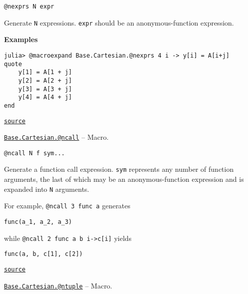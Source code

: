 \begin{adjustwidth}{2em}{0pt}


\begin{verbatim}
@nexprs N expr
\end{verbatim}

Generate \texttt{N} expressions. \texttt{expr} should be an anonymous-function expression.

\textbf{Examples}


\begin{verbatim}
julia> @macroexpand Base.Cartesian.@nexprs 4 i -> y[i] = A[i+j]
quote
    y[1] = A[1 + j]
    y[2] = A[2 + j]
    y[3] = A[3 + j]
    y[4] = A[4 + j]
end
\end{verbatim}



\href{https://github.com/JuliaLang/julia/blob/9058264a69f9efc1af805c4473c946f87859b731/base/cartesian.jl#L111-L126}{\texttt{source}}


\end{adjustwidth}
\hypertarget{16431416314224139891}{}
\hyperlink{16431416314224139891}{\texttt{Base.Cartesian.@ncall}}  -- {Macro.}

\begin{adjustwidth}{2em}{0pt}


\begin{verbatim}
@ncall N f sym...
\end{verbatim}

Generate a function call expression. \texttt{sym} represents any number of function arguments, the last of which may be an anonymous-function expression and is expanded into \texttt{N} arguments.

For example, \texttt{@ncall 3 func a} generates


\begin{lstlisting}
func(a_1, a_2, a_3)
\end{lstlisting}

while \texttt{@ncall 2 func a b i->c[i]} yields


\begin{lstlisting}
func(a, b, c[1], c[2])
\end{lstlisting}



\href{https://github.com/JuliaLang/julia/blob/9058264a69f9efc1af805c4473c946f87859b731/base/cartesian.jl#L89-L103}{\texttt{source}}


\end{adjustwidth}
\hypertarget{4425932542618492714}{}
\hyperlink{4425932542618492714}{\texttt{Base.Cartesian.@ntuple}}  -- {Macro.}

